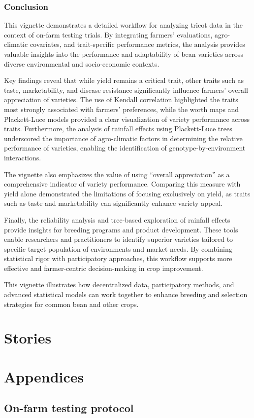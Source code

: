 \documentclass[
]{book}
\begin{document}
\subsection{Conclusion}\label{conclusion}

This vignette demonstrates a detailed workflow for analyzing tricot data in the context of on-farm testing trials. By integrating farmers' evaluations, agro-climatic covariates, and trait-specific performance metrics, the analysis provides valuable insights into the performance and adaptability of bean varieties across diverse environmental and socio-economic contexts.

Key findings reveal that while yield remains a critical trait, other traits such as taste, marketability, and disease resistance significantly influence farmers' overall appreciation of varieties. The use of Kendall correlation highlighted the traits most strongly associated with farmers' preferences, while the worth maps and Plackett-Luce models provided a clear visualization of variety performance across traits. Furthermore, the analysis of rainfall effects using Plackett-Luce trees underscored the importance of agro-climatic factors in determining the relative performance of varieties, enabling the identification of genotype-by-environment interactions.

The vignette also emphasizes the value of using ``overall appreciation'' as a comprehensive indicator of variety performance. Comparing this measure with yield alone demonstrated the limitations of focusing exclusively on yield, as traits such as taste and marketability can significantly enhance variety appeal.

Finally, the reliability analysis and tree-based exploration of rainfall effects provide insights for breeding programs and product development. These tools enable researchers and practitioners to identify superior varieties tailored to specific target population of environments and market needs. By combining statistical rigor with participatory approaches, this workflow supports more effective and farmer-centric decision-making in crop improvement.

This vignette illustrates how decentralized data, participatory methods, and advanced statistical models can work together to enhance breeding and selection strategies for common bean and other crops.

\chapter{Stories}\label{stories}

\chapter{Appendices}\label{appendices}

\section{On-farm testing protocol}\label{on-farm-testing-protocol}

  
\end{document}
